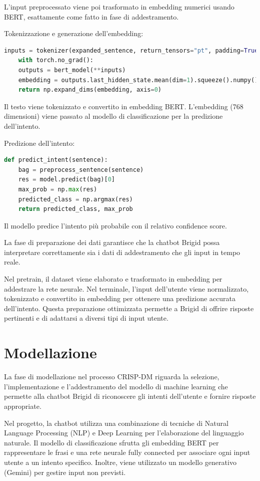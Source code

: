 \documentclass[12pt, letterpaper]{article}
\begin{document}
L'input preprocessato viene poi trasformato in embedding numerici usando BERT, esattamente come fatto in fase di addestramento.

Tokenizzazione e generazione dell'embedding:

\begin{lstlisting}[language=Python]
	inputs = tokenizer(expanded_sentence, return_tensors="pt", padding=True, truncation=True, max_length=50)
	with torch.no_grad():
	outputs = bert_model(**inputs)
	embedding = outputs.last_hidden_state.mean(dim=1).squeeze().numpy()
	return np.expand_dims(embedding, axis=0)
\end{lstlisting}

Il testo viene tokenizzato e convertito in embedding BERT. L’embedding (768 dimensioni) viene passato al modello di classificazione per la predizione dell’intento.

Predizione dell’intento:

\begin{lstlisting}[language=Python]
	def predict_intent(sentence):
	bag = preprocess_sentence(sentence)
	res = model.predict(bag)[0]
	max_prob = np.max(res)
	predicted_class = np.argmax(res)
	return predicted_class, max_prob
\end{lstlisting}

Il modello predice l’intento più probabile con il relativo confidence score.

La fase di preparazione dei dati garantisce che la chatbot Brigid possa interpretare correttamente sia i dati di addestramento che gli input in tempo reale.

Nel pretrain, il dataset viene elaborato e trasformato in embedding per addestrare la rete neurale. Nel terminale, l’input dell’utente viene normalizzato, tokenizzato e convertito in embedding per ottenere una predizione accurata dell’intento. Questa preparazione ottimizzata permette a Brigid di offrire risposte pertinenti e di adattarsi a diversi tipi di input utente.
\newpage

\section{Modellazione}
La fase di modellazione nel processo CRISP-DM riguarda la selezione, l'implementazione e l'addestramento del modello di machine learning che permette alla chatbot Brigid di riconoscere gli intenti dell'utente e fornire risposte appropriate.

Nel progetto, la chatbot utilizza una combinazione di tecniche di Natural Language Processing (NLP) e Deep Learning per l'elaborazione del linguaggio naturale. Il modello di classificazione sfrutta gli embedding BERT per rappresentare le frasi e una rete neurale fully connected per associare ogni input utente a un intento specifico. Inoltre, viene utilizzato un modello generativo (Gemini) per gestire input non previsti.
\end{document}
